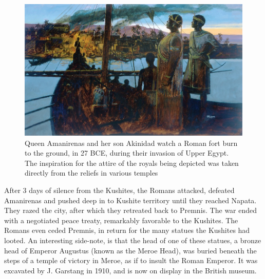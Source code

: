 \documentclass[a4paper,12pt]{scrreprt}
\begin{document}
\begin{figure}[H]
	\centering
	\includegraphics[width=\textwidth]{img/heros/queen_amanirenas_roman_fort_burn}
	\caption{Queen Amanirenas and her son Akinidad watch a Roman fort burn to the ground, in 27 BCE, during their invasion of Upper Egypt. The inspiration for the attire of the royals being depicted was taken directly from the reliefs in various temples}
\end{figure}

After 3 days of silence from the Kushites, the Romans attacked, defeated Amanirenas and pushed deep in to Kushite territory until they reached Napata. They razed the city, after which they retreated back to Premnis. The war ended with a negotiated peace treaty, remarkably favorable to the Kushites. The Romans even ceded Premnis, in return for the many statues the Kushites had looted. An interesting side-note, is that the head of one of these statues, a bronze head of Emperor Augustus (known as the Meroe Head), was buried beneath the steps of a temple of victory in Meroe, as if to insult the Roman Emperor. It was excavated by J. Garstang in 1910, and is now on display in the British museum.
\end{document}
